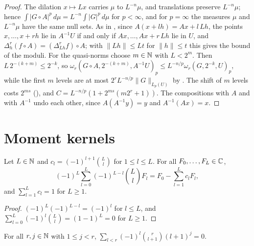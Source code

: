 \begin{proof}
\leanok
{}
The dilation $x \mapsto L x$ carries $\mu$ to $L^{-n} \mu$, and translations preserve
$L^{-n} \mu$; hence $\int |G \circ A|^p \, d\mu = L^{-n} \int |G|^p \, d\mu$ for $p < \infty$,
and for $p = \infty$ the measures $\mu$ and $L^{-n} \mu$ have the same null sets. As in
, since $A(x + lh) = A x + l \, L h$, the points
$x, \dots, x + rh$ lie in $A^{-1}U$ if and only if $A x, \dots, A x + r \, L h$ lie in $U$, and
$\Delta_h^r (f \circ A) = (\Delta_{Lh}^r f) \circ A$; with $\|L h\| \leq L t$ for
$\|h\| \leq t$ this gives the bound of the moduli. For the
quasi-norms choose $m \in \mathbb{N}$ with $L < 2^m$. Then $L \, 2^{-(k+m)} \leq 2^{-k}$, so
$\omega_r(G \circ A, 2^{-(k+m)}, A^{-1}U)_p \leq L^{-n/p} \omega_r(G, 2^{-k}, U)_p$, while the
first $m$ levels are at most $2^r L^{-n/p} \|G\|_{L_p(U)}$ by . The shift of
$m$ levels costs $2^{ms}$ (), and $C = L^{-n/p} (1 + 2^{ms} (m 2^r + 1))$.
The compositions with $A$ and with $A^{-1}$ undo each other, since $A(A^{-1} y) = y$ and
$A^{-1}(A x) = x$.
\end{proof}

\section{Moment kernels}

\begin{lemma}
\label{lem:moment-coefficients}
\leanok
Let $L \in \mathbb{N}$ and $c_l = (-1)^{l+1} \binom{L}{l}$ for $1 \leq l \leq L$. For all
$F_0, \dots, F_L \in \mathbb{C}$,
\[
  (-1)^L \sum_{l=0}^L (-1)^{L-l} \binom{L}{l} F_l = F_0 - \sum_{l=1}^L c_l F_l ,
\]
and $\sum_{l=1}^L c_l = 1$ for $L \geq 1$.
\end{lemma}

\begin{proof}
\leanok
$(-1)^L (-1)^{L-l} = (-1)^l$ for $l \leq L$, and $\sum_{l=0}^L (-1)^l \binom{L}{l} = (1 - 1)^L = 0$
for $L \geq 1$.
\end{proof}

\begin{lemma}
\label{lem:jackson-moments}
\leanok
{}
For all $r, j \in \mathbb{N}$ with $1 \leq j < r$,
$\sum_{l < r} (-1)^l \binom{r}{l+1} (l + 1)^j = 0$.
\end{lemma}


